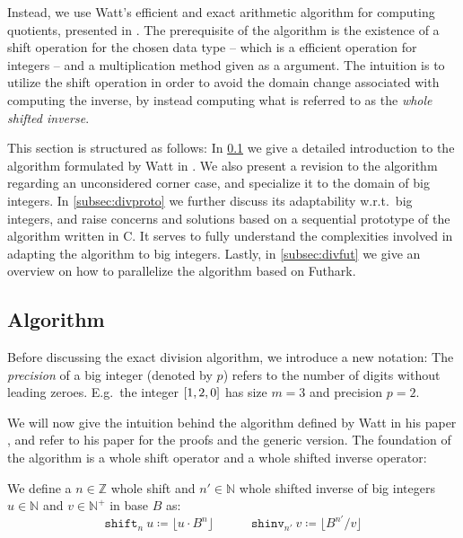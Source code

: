 Instead, we use Watt's efficient and exact arithmetic algorithm for computing
quotients, presented in \cite{watt2023efficient}. The prerequisite of the
algorithm is the existence of a shift operation for the chosen data type -- which
is a efficient operation for integers -- and a multiplication method given as a
argument. The intuition is to utilize the shift operation in order to avoid the
domain change associated with computing the inverse, by instead computing what
is referred to as the \textit{whole shifted inverse}.

This section is structured as follows: In \ref{subsec:divalg} we give a detailed
introduction to the algorithm formulated by Watt in \cite{watt2023efficient}. We
also present a revision to the algorithm regarding an unconsidered corner case,
and specialize it to the domain of big integers. In \ref{subsec:divproto} we
further discuss its adaptability w.r.t.\ big integers, and raise concerns and
solutions based on a sequential prototype of the algorithm written in C. It
serves to fully understand the complexities involved in adapting the algorithm
to big integers. Lastly, in \ref{subsec:divfut} we give an overview on how to
parallelize the algorithm based on Futhark.

\subsection{Algorithm}
\label{subsec:divalg}

Before discussing the exact division algorithm, we introduce a new notation: The
\textit{precision} of a big integer (denoted by $p$) refers to the number of
digits without leading zeroes. E.g.\ the integer $\mathtt{[}1,2,0\mathtt{]}$ has size $m=3$
and precision $p=2$.

We will now give the intuition behind the algorithm defined by Watt in his paper
\cite{watt2023efficient}, and refer to his paper for the proofs and the generic
version. The foundation of the algorithm is a whole shift operator and a whole
shifted inverse operator:

\begin{definition}\label{def:shifts}
  We define a $n \in \mathbb{Z}$ whole shift and $n' \in \mathbb{N}$ whole shifted inverse of big
  integers $u\in \mathbb{N}$ and $v\in \mathbb{N}^{+}$ in base $B$ as:
  \begin{equation}\label{eq:shifts}
    \mathtt{shift}_n~u \coloneq \lfloor u \cdot B^n \rfloor \quad \qquad \mathtt{shinv}_{n'}~v \coloneq \lfloor B^{n'}/ v \rfloor
    \end{equation}
\end{definition}


